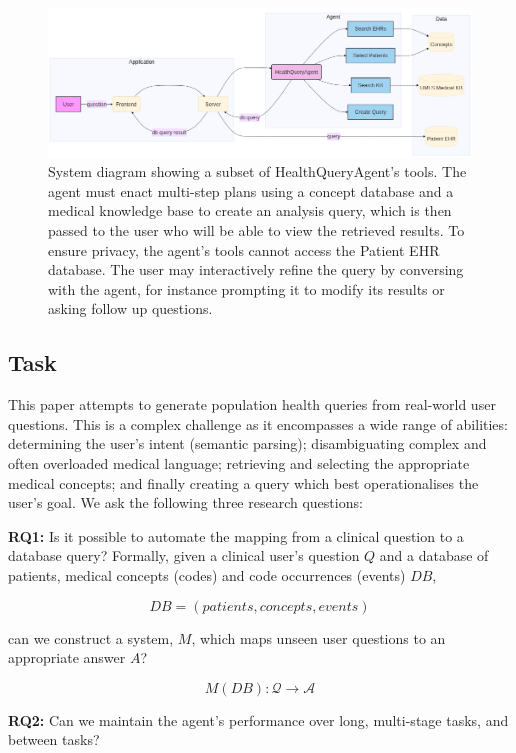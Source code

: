 \documentclass[11pt]{article}
\begin{document}
\begin{figure}[t]
  \includegraphics[width=\linewidth]{content/system_diagram3.png}
	\caption{System diagram showing a subset of HealthQueryAgent's tools. The agent must enact multi-step plans using a concept database and a medical knowledge base to create an analysis query, which is then passed to the user who will be able to view the retrieved results. To ensure privacy, the agent's tools cannot access the Patient EHR database. The user may interactively refine the query by conversing with the agent, for instance prompting it to modify its results or asking follow up questions.}
	\label{fig:system-diagram}
\end{figure}

\subsection{Task}
This paper attempts to generate population health queries from real-world user questions.
This is a complex challenge as it encompasses a wide range of abilities: determining the user's intent (semantic parsing); disambiguating complex and often overloaded medical language; retrieving and selecting the appropriate medical concepts; and finally creating a query which best operationalises the user's goal.
We ask the following three research questions:

\textbf{RQ1:} Is it possible to automate the mapping from a clinical question to a database query? Formally, given a clinical user's question $Q$ and a database of patients, medical concepts (codes) and code occurrences (events) $DB$,

  $$ DB = (patients, concepts, events) $$

can we construct a system, $M$, which maps unseen user questions to an appropriate answer $A$?

  $$ M(DB): \mathcal{Q} \rightarrow \mathcal{A} $$

\textbf{RQ2:} Can we maintain the agent's performance over long, multi-stage tasks, and between tasks?
\end{document}
